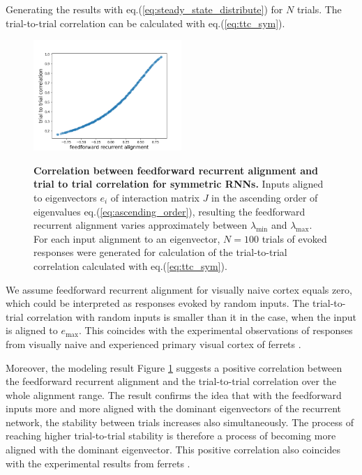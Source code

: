 \documentclass[11pt]{article}
\begin{document}
	Generating the results with eq.(\ref{eq:steady_state_distribute}) for $N$ trials. The trial-to-trial correlation can be calculated with eq.(\ref{eq:ttc_sym}). 

		\begin{figure} 
			\centering
			\caption{\textbf{Correlation between feedforward recurrent alignment and trial to trial correlation for symmetric RNNs.} Inputs aligned to eigenvectors $e_i$ of interaction matrix $J$ in the ascending order of eigenvalues eq.(\ref{eq:ascending_order}), resulting the feedforward recurrent alignment varies approximately between $\lambda_{\text{min}}$ and $\lambda_{\text{max}}$. For each input alignment to an eigenvector, $N=100$ trials of evoked responses were generated for calculation of the trial-to-trial correlation calculated with eq.(\ref{eq:ttc_sym}).}
			\includegraphics[width=0.5\textwidth]{../figures/ttc_sym.png}
			\label{fig:ttc_ffrec_sym}
		\end{figure}
	
	We assume feedforward recurrent alignment for visually naive cortex equals zero, which could be interpreted as responses evoked by random inputs. The trial-to-trial correlation with random inputs is smaller than it in the case, when the input is aligned to $e_{\text{max}}$. This coincides with the experimental observations of responses from visually naive and experienced primary visual cortex of ferrets \cite{tragenap2023nature}. 
	
	Moreover, the modeling result Figure \ref{fig:ttc_ffrec_sym} suggests a positive correlation between the feedforward recurrent alignment and the trial-to-trial correlation over the whole alignment range. The result confirms the idea that with the feedforward inputs more and more aligned with the dominant eigenvectors of the recurrent network, the stability between trials increases also simultaneously. The process of reaching higher trial-to-trial stability is therefore a process of becoming more aligned with the dominant eigenvector. 
	This positive correlation also coincides with the experimental results from ferrets \cite{tragenap2023nature}.
	
\end{document}
